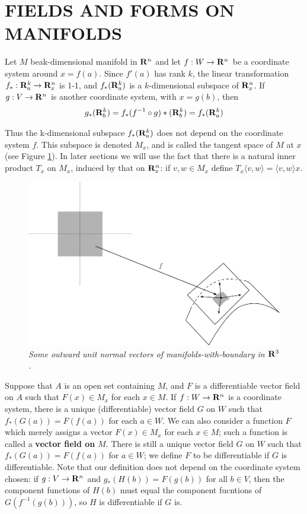 \clearpage
\section{FIELDS AND FORMS ON MANIFOLDS}
Let $M$ beak-dimensional manifold in $\mathbf{R}^n$ and let $f: W\to \mathbf{R}^n$
be a coordinate system around $x = f(a)$. Since $f'(a)$ has rank $k$, 
the linear transformation $f_*:\mathbf{R}^k_a\to\mathbf{R}^n_x$ is 1-1, and $f_*(\mathbf{R}^k_a)$
is a $k$-dimensional subspace of $\mathbf{R}^n_x$. If $g:V\to\mathbf{R}^n$ is another coordinate
system, with $x=g(b)$, then 
\begin{align*}
    g_*(\mathbf{R}^k_b) = f_*(f^{-1}\circ g)*(\mathbf{R}^k_b) = f_*(\mathbf{R}^k_a)
\end{align*}

Thus the k-dimensional subspace $f_*(\mathbf{R}^k_a)$ does not depend on
the coordinate system $f$. This subspace is denoted $M_x$, and
is called the tangent space of $M$ at $x$ (see Figure \ref{Fig 5-5}).
In later sections we will use the fact that there is a natural inner
product $T_x$ on $M_x$, induced by that on $\mathbf{R}^n_x$: if $v,w\in M_x$ define
$T_x\langle v,w\rangle = \langle v,w\rangle x$.

\begin{figure}[!htb]
    \centering
    \includegraphics[width=.75\linewidth]{./pics/Fig5-5.pdf}
    \caption{\textit{Some outward unit normal vectors of manifolds-with-boundary in $\mathbf{R}^3$.}}
    \label{Fig 5-5}
\end{figure}

Suppose that $A$ is an open set containing $M$, and $F$ is a differentiable vector 
field on $A$ such that $F(x)\in M_x$ for each $x\in M$. If $f:W\to \mathbf{R}^n$ is a coordinate 
system, there is a unique (differentiable) vector field $G$ on $W$ such that 
$f_*(G(a)) = F(f(a))$ for each $a\in W$. We can also consider a function $F$ which merely assigns 
a vector $F(x)\in M_x$ for each $x\in M$; such a function is called a \textbf{vector field on} $M$. 
There is still a unique vector field $G$ on $W$ such that $f_*(G(a)) = F(f(a))$ for $a\in W$; we 
define $F$ to be differentiable if $G$ is differentiable. Note that our definition does not depend 
on the coordinate system chosen: if $g:V\to\mathbf{R}^n$ and $g_*(H(b))=F(g(b))$ for all $b\in V$, then the 
component functions of $H(b)$ must equal the component fucntions of $G(f^{-1}(g(b)))$, so $H$ is 
differentiable if $G$ is.

